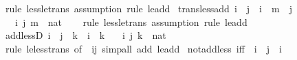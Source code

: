 \begin{isabellebody}
\ {\isacharparenleft}{\kern0pt}rule\ less{\isacharunderscore}{\kern0pt}le{\isacharunderscore}{\kern0pt}trans{\isacharcomma}{\kern0pt}\ assumption{\isacharcomma}{\kern0pt}\ rule\ le{\isacharunderscore}{\kern0pt}add{}{\isacharparenright}{\kern0pt}%
\endisatagproof
{\isafoldproof}%
%
\isadelimproof
\isanewline
%
\endisadelimproof
\isanewline
{}\isamarkupfalse%
\ trans{\isacharunderscore}{\kern0pt}less{\isacharunderscore}{\kern0pt}add{}{\isacharcolon}{\kern0pt}\ {\isachardoublequoteopen}i\ {\isacharless}{\kern0pt}\ j\ {\isasymLongrightarrow}\ i\ {\isacharless}{\kern0pt}\ m\ {\isacharplus}{\kern0pt}\ j{\isachardoublequoteclose}\isanewline
\ \ \ i\ j\ m\ {\isacharcolon}{\kern0pt}{\isacharcolon}{\kern0pt}\ nat\isanewline
%
\isadelimproof
\ \ %
\endisadelimproof
%
\isatagproof
{}\isamarkupfalse%
\ {\isacharparenleft}{\kern0pt}rule\ less{\isacharunderscore}{\kern0pt}le{\isacharunderscore}{\kern0pt}trans{\isacharcomma}{\kern0pt}\ assumption{\isacharcomma}{\kern0pt}\ rule\ le{\isacharunderscore}{\kern0pt}add{}{\isacharparenright}{\kern0pt}%
\endisatagproof
{\isafoldproof}%
%
\isadelimproof
\isanewline
%
\endisadelimproof
\isanewline
{}\isamarkupfalse%
\ add{\isacharunderscore}{\kern0pt}lessD{}{\isacharcolon}{\kern0pt}\ {\isachardoublequoteopen}i\ {\isacharplus}{\kern0pt}\ j\ {\isacharless}{\kern0pt}\ k\ {\isasymLongrightarrow}\ i\ {\isacharless}{\kern0pt}\ k{\isachardoublequoteclose}\isanewline
\ \ \ i\ j\ k\ {\isacharcolon}{\kern0pt}{\isacharcolon}{\kern0pt}\ nat\isanewline
%
\isadelimproof
\ \ %
\endisadelimproof
%
\isatagproof
{}\isamarkupfalse%
\ {\isacharparenleft}{\kern0pt}rule\ le{\isacharunderscore}{\kern0pt}less{\isacharunderscore}{\kern0pt}trans\ {\isacharbrackleft}{\kern0pt}of\ {\isacharunderscore}{\kern0pt}\ {\isachardoublequoteopen}i{\isacharplus}{\kern0pt}j{\isachardoublequoteclose}{\isacharbrackright}{\kern0pt}{\isacharparenright}{\kern0pt}\ {\isacharparenleft}{\kern0pt}simp{\isacharunderscore}{\kern0pt}all\ add{\isacharcolon}{\kern0pt}\ le{\isacharunderscore}{\kern0pt}add{}{\isacharparenright}{\kern0pt}%
\endisatagproof
{\isafoldproof}%
%
\isadelimproof
\isanewline
%
\endisadelimproof
\isanewline
{}\isamarkupfalse%
\ not{\isacharunderscore}{\kern0pt}add{\isacharunderscore}{\kern0pt}less{}\ {\isacharbrackleft}{\kern0pt}iff{\isacharbrackright}{\kern0pt}{\isacharcolon}{\kern0pt}\ {\isachardoublequoteopen}{\isasymnot}\ i\ {\isacharplus}{\kern0pt}\ j\ {\isacharless}{\kern0pt}\ i{\isachardoublequoteclose}\isanewline

\end{isabellebody}
